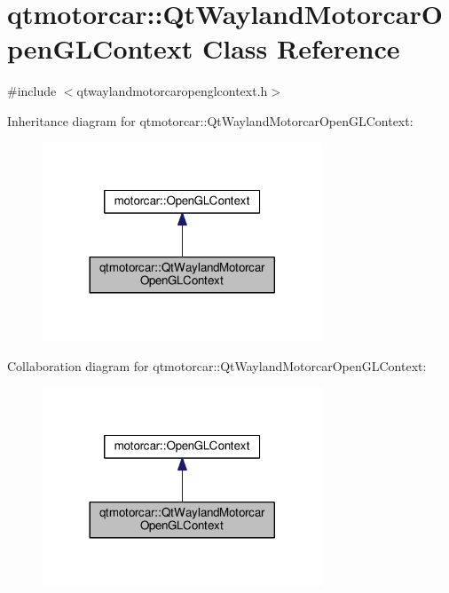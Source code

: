 \hypertarget{classqtmotorcar_1_1QtWaylandMotorcarOpenGLContext}{\section{qtmotorcar\-:\-:Qt\-Wayland\-Motorcar\-Open\-G\-L\-Context Class Reference}
\label{classqtmotorcar_1_1QtWaylandMotorcarOpenGLContext}
}


{\ttfamily \#include $<$qtwaylandmotorcaropenglcontext.\-h$>$}



Inheritance diagram for qtmotorcar\-:\-:Qt\-Wayland\-Motorcar\-Open\-G\-L\-Context\-:
\nopagebreak
\begin{figure}[H]
\begin{center}
\leavevmode
\includegraphics[width=236pt]{classqtmotorcar_1_1QtWaylandMotorcarOpenGLContext__inherit__graph}
\end{center}
\end{figure}


Collaboration diagram for qtmotorcar\-:\-:Qt\-Wayland\-Motorcar\-Open\-G\-L\-Context\-:
\nopagebreak
\begin{figure}[H]
\begin{center}
\leavevmode
\includegraphics[width=236pt]{classqtmotorcar_1_1QtWaylandMotorcarOpenGLContext__coll__graph}
\end{center}
\end{figure}
